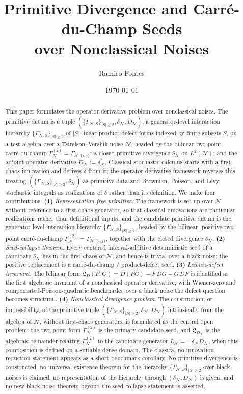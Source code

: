 \documentclass[11pt,reqno]{amsart}
\title{Primitive Divergence and Carr\'e-du-Champ Seeds\\
       over Nonclassical Noises}
\author{Ramiro Fontes}
\date{\today}
\theoremstyle{plain}
\theoremstyle{definition}
\theoremstyle{remark}
\begin{document}
\begin{abstract}
This paper formulates the operator-derivative problem over
nonclassical noises. The primitive datum is a tuple
$(\{\Gamma_{\mathcal N,S}\}_{|S|\ge 2},\delta_{\mathcal N},D_{\mathcal N})$:
a generator-level interaction hierarchy
$\{\Gamma_{\mathcal N,S}\}_{|S|\ge 2}$ of $|S|$-linear
product-defect forms indexed by finite subsets $S$, on a test
algebra over a Tsirelson--Vershik noise $\mathcal N$, headed by the
bilinear two-point carr\'e-du-champ
$\Gamma_{\mathcal N}^{(2)}=\Gamma_{\mathcal N,\{i,j\}}$;
a closed primitive divergence $\delta_{\mathcal N}$ on
$L^{2}(\mathcal N)$; and the adjoint operator derivative
$D_{\mathcal N}:=\delta_{\mathcal N}^{*}$.
Classical stochastic calculus starts with a first-chaos innovation
and derives $\delta$ from it; the operator-derivative framework
reverses this, treating
$(\{\Gamma_{\mathcal N,S}\}_{|S|\ge 2},\delta_{\mathcal N})$
as primitive data and Brownian, Poisson, and L\'evy stochastic
integrals as realizations of $\delta$ rather than its definition.
We make four contributions.
\textbf{(1)} \emph{Representation-free primitive.} The framework is
set up over $\mathcal N$ without reference to a first-chaos
generator, so that classical innovations are particular realizations
rather than definitional inputs, and the candidate primitive datum
is the generator-level interaction hierarchy
$\{\Gamma_{\mathcal N,S}\}_{|S|\ge 2}$, headed by the bilinear,
positive two-point carr\'e-du-champ
$\Gamma_{\mathcal N}^{(2)}=\Gamma_{\mathcal N,\{i,j\}}$, together
with the closed divergence $\delta_{\mathcal N}$.
\textbf{(2)} \emph{Seed-collapse theorem.} Every centered
interval-additive deterministic seed of a candidate
$\delta_{\mathcal N}$ lies in the first chaos of $\mathcal N$, and
hence is trivial over a black noise; the positive replacement is a
carr\'e-du-champ / product-defect seed.
\textbf{(3)} \emph{Leibniz-defect invariant.} The bilinear form
$\mathfrak L_D(F,G)=D(FG)-F\,DG-G\,DF$ is identified as the first
algebraic invariant of a nonclassical operator derivative, with
Wiener-zero and compensated-Poisson-quadratic benchmarks; over a
black noise the defect question becomes structural.
\textbf{(4)} \emph{Nonclassical divergence problem.} The
construction, or impossibility, of the primitive tuple
$(\{\Gamma_{\mathcal N,S}\}_{|S|\ge 2},\delta_{\mathcal N},D_{\mathcal N})$
intrinsically from the algebra of $\mathcal N$, without first-chaos
generators, is formulated as the central open problem; the two-point
form $\Gamma_{\mathcal N}^{(2)}$ is the primary candidate seed, and
$\mathfrak L_{D_{\mathcal N}}$ is the algebraic remainder relating
$\Gamma_{\mathcal N}^{(2)}$ to the candidate generator
$L_{\mathcal N}=-\delta_{\mathcal N}D_{\mathcal N}$, when this
composition is defined on a suitable dense domain. The classical
no-innovation-reduction statement appears as a short benchmark
corollary. No primitive divergence is constructed, no universal
existence theorem for the hierarchy
$\{\Gamma_{\mathcal N,S}\}_{|S|\ge 2}$ over black noises is
claimed, no representation of the hierarchy through
$(\delta_{\mathcal N},D_{\mathcal N})$ is given, and no new
black-noise theorem beyond the seed-collapse statement is asserted.
\end{abstract}
\end{document}
